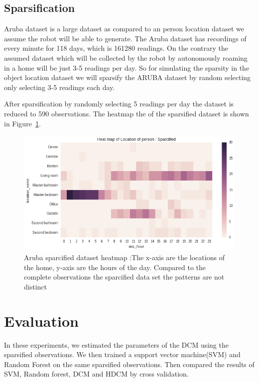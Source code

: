\subsection*{Sparsification}
Aruba dataset is a large dataset as compared to an person location dataset we assume the robot will be able to generate. The Aruba dataset has recordings of every minute for 118 days, which is 161280 readings.
On the contrary the assumed dataset which will be collected by the robot by autonomously roaming in a home will be just 3-5 readings per day.
So for simulating the sparsity in the object location dataset we will sparsify the ARUBA dataset by random selecting only selecting 3-5 readings each day.

After sparsification by randomly selecting 5 readings per day the dataset is reduced to 590 observations. The heatmap the of the sparsified dataset is shown in Figure~\ref{aruba-reduced-hist}. 

\begin{figure}[htp]
\centering
\includegraphics[width=\textwidth]{images/aruba-reduced-heatmap.png}
\caption[Aruba sparcified dataset heatmap]{Aruba sparcified dataset heatmap :The x-axis are the locations of the home, y-axis are the hours of the day. Compared to the complete observations the sparcified data set the patterns are not distinct}
\label{aruba-reduced-hist}
\end{figure}

\FloatBarrier

\section{Evaluation}
In these experiments, we estimated the parameters of the DCM using the sparsified observations. We then trained a support vector machine(SVM) and Random Forest on the same sparsified observations. Then compared the results of SVM, Random forest, DCM and HDCM by cross validation.




